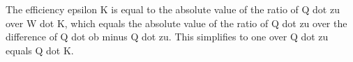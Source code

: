 The efficiency epsilon K is equal to the absolute value of the ratio of Q dot zu over W dot K, which equals the absolute value of the ratio of Q dot zu over the difference of Q dot ob minus Q dot zu. This simplifies to one over Q dot zu equals Q dot K.